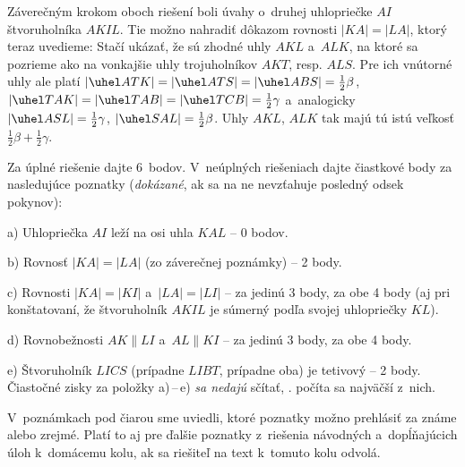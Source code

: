 {\Pozn
Záverečným krokom oboch riešení boli úvahy
o~druhej uhlopriečke $AI$ štvoruholníka $AKIL$. Tie možno nahradiť
dôkazom rovnosti $|KA|=|LA|$, ktorý teraz uvedieme: Stačí ukázať,
že sú zhodné uhly $AKL$ a~$ALK$, na ktoré sa pozrieme ako na
vonkajšie uhly trojuholníkov $AKT$, resp. $ALS$. Pre ich vnútorné uhly
ale platí $|\uhel ATK|=|\uhel ATS|=|\uhel ABS|=\frac12\beta$,
$|\uhel TAK|= |\uhel TAB|=|\uhel TCB|=\frac12\gamma$ a~analogicky
$|\uhel ASL|=\frac12\gamma$, $|\uhel SAL|=\frac12\beta$. Uhly $AKL$, $ALK$
tak majú tú istú veľkosť $\frac12\beta+\frac12\gamma$.

\schemaABC
Za úplné riešenie dajte 6~bodov.
V~neúplných riešeniach dajte čiastkové body za nasledujúce
poznatky (\emph{dokázané}, ak sa na ne nevzťahuje posledný odsek
pokynov):
\item{a)} Uhlopriečka $AI$ leží na osi uhla $KAL$ -- 0 bodov.
\item{b)} Rovnosť $|KA|=|LA|$ (zo záverečnej poznámky) -- 2 body.
\item{c)} Rovnosti $|KA|=|KI|$ a~$|LA|=|LI|$ -- za jedinú 3 body, za obe 4
body (aj pri konštatovaní, že štvoruholník $AKIL$ je súmerný
podľa svojej uhlopriečky $KL$).
\item{d)} Rovnobežnosti $AK\parallel LI$ a~$AL\parallel KI$ -- za jedinú 3
body, za obe 4 body.
\item{e)} Štvoruholník $LICS$ (prípadne $LIBT$, prípadne oba) je tetivový -- 2 body.
\endgraf\noindent
Čiastočné zisky za položky a)\,--\,e) \emph{sa nedajú} sčítať, \tj. počíta sa
najväčší z~nich.

V~poznámkach pod čiarou sme uviedli, ktoré poznatky možno prehlásiť
za známe alebo zrejmé. Platí to aj pre ďalšie poznatky z~riešenia
návodných a~dopĺňajúcich úloh k~domácemu kolu,
ak sa riešiteľ na text k~tomuto kolu odvolá.
\endschema}

